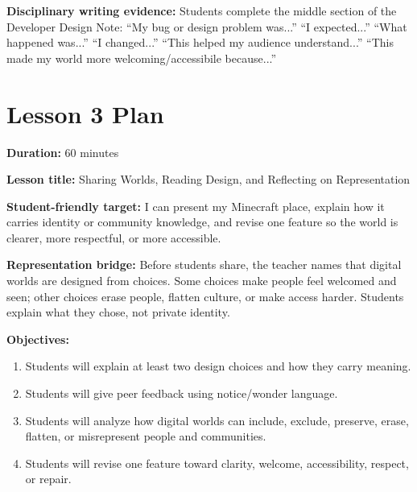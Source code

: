 \textbf{Disciplinary writing evidence:} \textcolor{LessonTwoAccent}{Students complete the middle section of the Developer Design Note: ``My bug or design problem was...'' ``I expected...'' ``What happened was...'' ``I changed...'' ``This helped my audience understand...'' ``This made my world more welcoming/accessibile because...''}

\newpage
\section*{Lesson 3 Plan}

\textbf{Duration:} 60 minutes

\textbf{Lesson title:} Sharing Worlds, Reading Design, and Reflecting on Representation

\textbf{Student-friendly target:} I can present my Minecraft place, explain how it carries identity or community knowledge, and revise one feature so the world is clearer, more respectful, or more accessible.

\textbf{Representation bridge:} \textcolor{LessonTwoAccent}{Before students share, the teacher names that digital worlds are designed from choices. Some choices make people feel welcomed and seen; other choices erase people, flatten culture, or make access harder. Students explain what they chose, not private identity.}

\textbf{Objectives:}
\begin{enumerate}[leftmargin=*]
    \item Students will explain at least two design choices and how they carry meaning.
    \item Students will give peer feedback using notice/wonder language.
    \item Students will analyze how digital worlds can include, exclude, preserve, erase, flatten, or misrepresent people and communities.
    \item Students will revise one feature toward clarity, welcome, accessibility, respect, or repair.
\end{enumerate}

